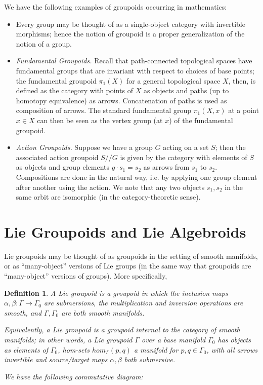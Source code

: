 \documentclass{tufte-handout}
\newtheorem{defn}{Definition}
\begin{document}
We have the following examples of groupoids occurring in mathematics:
\begin{itemize}
\item Every group may be thought of as a single-object category with invertible morphisms; hence the notion of groupoid is a proper generalization of the notion of a group.

\item \emph{Fundamental Groupoids.} Recall that path-connected topological spaces have fundamental groups that are invariant with respect to choices of base points; the fundamental groupoid $\pi_1(X)$ for a general topological space $X$, then, is defined as the category with points of $X$ as objects and paths (up to homotopy equivalence) as arrows. Concatenation of paths is used as composition of arrows. The standard fundamental group $\pi_1(X,x)$ at a point $x \in X$ can then be seen as the vertex group (at $x$) of the fundamental groupoid.

\item \emph{Action Groupoids.} Suppose we have a group $G$ acting on a set $S$; then the associated action groupoid $S//G$ is given by the category with elements of $S$ as objects and group elements $g \cdot s_1 = s_2$ as arrows from $s_1$ to $s_2$. Compositions are done in the natural way, i.e. by applying one group element after another using the action. We note that any two objects $s_1,s_2$ in the same orbit are isomorphic (in the category-theoretic sense).
\end{itemize}

\section{Lie Groupoids and Lie Algebroids}
Lie groupoids may be thought of as groupoids in the setting of smooth manifolds, or as ``many-object'' versions of Lie groups (in the same way that groupoids are ``many-object'' versions of groups). More specifically,

\begin{defn}
A \emph{Lie groupoid} is a groupoid in which the inclusion maps $\alpha, \beta : \Gamma \to \Gamma_0$ are submersions, the multiplication and inversion operations are smooth, and $\Gamma, \Gamma_0$ are both smooth manifolds.

Equivalently, a Lie groupoid is a groupoid internal to the category of smooth manifolds; in other words, a Lie groupoid $\Gamma$ over a base manifold $\Gamma_0$ has objects as elements of $\Gamma_0$, hom-sets $hom_\Gamma(p,q)$ a manifold for $p,q \in \Gamma_0$, with all arrows invertible and source/target maps $\alpha,\beta$ both submersive.

We have the following commutative diagram:

\end{defn}
\end{document}
